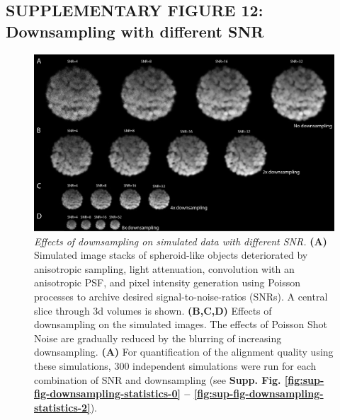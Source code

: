 \documentclass[]{spie}  %
\begin{document}
\subsection*{SUPPLEMENTARY FIGURE 12: Downsampling with different SNR}
\vspace{-2mm}
\begin{figure}[h!]
\includegraphics[width=\textwidth]{fig-downsampling.jpg}
\vspace{-2.0mm}
\caption{\hspace{-0.5mm} \emph{Effects of downsampling on simulated data with different SNR.} \textbf{(A)} Simulated image stacks of spheroid-like objects deteriorated by anisotropic sampling, light attenuation, convolution with an anisotropic PSF, and pixel intensity generation using Poisson processes to archive desired signal-to-noise-ratios (SNRs). A central slice through 3d volumes is shown. \textbf{(B,C,D)} Effects of downsampling on the simulated images. The effects of Poisson Shot Noise are gradually reduced by the blurring of increasing downsampling. \textbf{(A)} For quantification of the alignment quality using these simulations, 300 independent simulations were run for each combination of SNR and downsampling (see \textbf{Supp. Fig. \ref{fig:sup-fig-downsampling-statistics-0} -- \ref{fig:sup-fig-downsampling-statistics-2}}).
}
\label{fig:sup-fig-downsampling}
\end{figure}

\pagebreak
\end{document}
